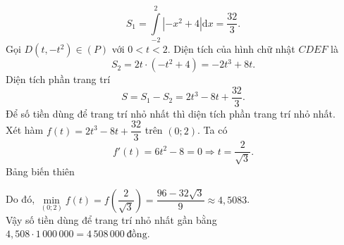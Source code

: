 \begin{ex}
{\begin{itemchoice}
			$$S_1=\displaystyle\int\limits_{-2}^{2}\left|-x^2+4\right|\mathrm{d}x=\dfrac{32}{3}.$$
			\itemch Gọi $D\left(t,-t^2\right)\in(P)$ với $0<t<2$. Diện tích của hình chữ nhật $CDEF$ là\\
			\[S_2=2t\cdot \left(-t^2+4\right)=-2t^3+8t.\]
			Diện tích phần trang trí
			\[S=S_1-S_2=2t^3-8t+\dfrac{32}{3}.\]
			Để số tiền dùng để trang trí nhỏ nhất thì diện tích phần trang trí nhỏ nhất.\\
			Xét hàm $f(t)=2t^3-8t+\dfrac{32}{3}$ trên $(0;2)$. Ta có
			\[f'(t)=6t^2-8=0\Rightarrow t= \dfrac{2}{\sqrt{3}}.\]
				Bảng biến thiên
				\begin{center}
				\end{center}
			Do đó, $\min\limits_{(0;2)}f(t)=f\left(\dfrac{2}{\sqrt{3}}\right)=\dfrac{96-32\sqrt{3}}{9}\approx 4{,}5083$.\\
				Vậy số tiền dùng để trang trí nhỏ nhất gần bằng	$4{,}508\cdot 1\,000\,000=4\,508\,000\ \text{đồng}.$
		\end{itemchoice}
	}
\end{ex}

